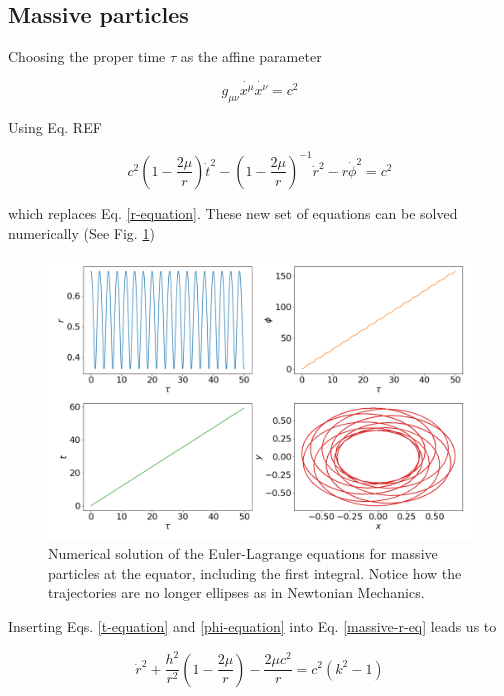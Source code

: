 \documentclass[letterpaper,11pt,onecolumn]{article}
\begin{document}
\subsection{Massive particles}

Choosing the proper time $\tau$ as the affine parameter 

\begin{equation*}
    g_{\mu \nu} \dot{x^\mu} \dot{x^\nu} = c^2
\end{equation*}

Using Eq. {\color{red} REF} 

\begin{equation} \label{massive-r-eq}
    c^2 \left( 1 - \frac{2 \mu}{r} \right) \dot{t}^2  - \left( 1 - \frac{2 \mu}{r} \right)^{-1} \dot{r}^2 - r\dot{\phi}^2  = c^2
\end{equation}

which replaces Eq. \ref{r-equation}. These new set of equations can be solved numerically (See Fig. \ref{fig:massive-set})


\begin{figure}[h!]
    \centering
    \includegraphics[width=0.8\linewidth]{Presentations/Images/2_first_orbits.png}
    \caption{Numerical solution of the Euler-Lagrange equations for massive particles at the equator, including the first integral. Notice how the trajectories are no longer ellipses as in Newtonian Mechanics. }
    \label{fig:massive-set}
\end{figure}


Inserting Eqs. \ref{t-equation} and \ref{phi-equation} into Eq. \ref{massive-r-eq} leads us to 

\begin{equation} \label{massive-r-tau}
    \dot{r}^2 + \frac{h^2}{r^2} \left( 1 - \frac{2\mu}{r}\right) - \frac{2\mu c^2}{r} = c^2 (k^2 - 1)
\end{equation}
\end{document}
